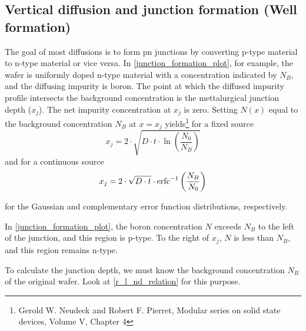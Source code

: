 \subsection{Vertical diffusion and junction formation (Well formation)}\label{building_wells}
The goal of most diffusions is to form pn junctions by converting p-type material to n-type material or vice versa.
In \autoref{junction_formation_plot}, for example, the wafer is uniformly doped n-type material with a concentration indicated by $N_B$, and the diffusing impurity is boron.
The point at which the diffused impurity profile intersects the background concentration is the mettalurgical junction depth ($x_j$).
The net impurity concentration at $x_j$ is zero.
Setting $N(x)$ equal to the background concentration $N_B$ at $x=x_j$ yields\footnote{Gerold W. Neudeck and Robert F. Pierret, Modular series on solid state devices, Volume V, Chapter 4} for a fixed source
\begin{equation}
x_j
=
2 \cdot\sqrt{D \cdot t \cdot \ln\left(\frac{N_0}{N_B}\right)}
\end{equation}
and for a continuous source
\begin{equation}
x_j
=
2 \cdot\sqrt{D \cdot t}
\cdot
\operatorname{erfc}^{-1}\left(\frac{N_B}{N_0}\right)
\end{equation}

for the Gaussian and complementary error function distributions, respectively.

In \autoref{junction_formation_plot}, the boron concentration $N$ exceeds $N_B$ to the left of the junction, and this region is p-type.
To the right of $x_j$, $N$ is less than $N_B$, and this region remains n-type.

To calculate the junction depth, we must know the background concentration $N_B$ of the original wafer.
Look at \autoref{r_l_nd_relation} for this purpose.


